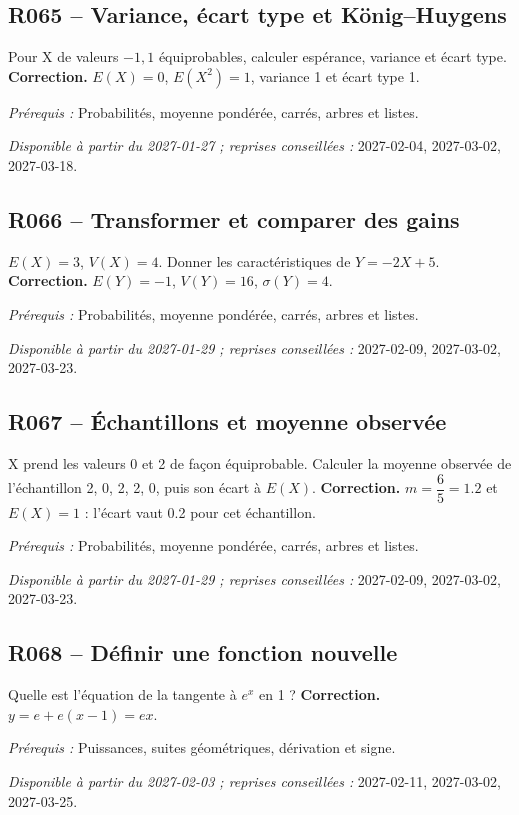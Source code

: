 \subsection*{R065 -- Variance, écart type et König–Huygens}\label{R065}
Pour X de valeurs $-1,1$ équiprobables, calculer espérance, variance et écart type.
\ifmxteacher\textbf{Correction.} $E(X)=0$, $E(X^2)=1$, variance 1 et écart type 1.\par\textit{Prérequis :} Probabilités, moyenne pondérée, carrés, arbres et listes.\par\textit{Disponible à partir du 2027-01-27 ; reprises conseillées :} 2027-02-04, 2027-03-02, 2027-03-18.\fi
{}\subsection*{R066 -- Transformer et comparer des gains}\label{R066}
$E(X)=3$, $V(X)=4$. Donner les caractéristiques de $Y=-2X+5$.
\ifmxteacher\textbf{Correction.} $E(Y)=-1$, $V(Y)=16$, $\sigma(Y)=4$.\par\textit{Prérequis :} Probabilités, moyenne pondérée, carrés, arbres et listes.\par\textit{Disponible à partir du 2027-01-29 ; reprises conseillées :} 2027-02-09, 2027-03-02, 2027-03-23.\fi
{}\subsection*{R067 -- Échantillons et moyenne observée}\label{R067}
X prend les valeurs 0 et 2 de façon équiprobable. Calculer la moyenne observée de l’échantillon 2, 0, 2, 2, 0, puis son écart à $E(X)$.
\ifmxteacher\textbf{Correction.} $m=\dfrac{6}{5}=\num{1,2}$ et $E(X)=1$ : l’écart vaut \num{0,2} pour cet échantillon.\par\textit{Prérequis :} Probabilités, moyenne pondérée, carrés, arbres et listes.\par\textit{Disponible à partir du 2027-01-29 ; reprises conseillées :} 2027-02-09, 2027-03-02, 2027-03-23.\fi
{}\subsection*{R068 -- Définir une fonction nouvelle}\label{R068}
Quelle est l’équation de la tangente à $e^x$ en 1 ?
\ifmxteacher\textbf{Correction.} $y=e+e(x-1)=ex$.\par\textit{Prérequis :} Puissances, suites géométriques, dérivation et signe.\par\textit{Disponible à partir du 2027-02-03 ; reprises conseillées :} 2027-02-11, 2027-03-02, 2027-03-25.\fi
